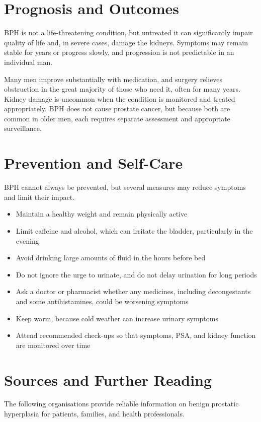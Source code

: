 \section*{Prognosis and Outcomes}
BPH is not a life-threatening condition, but untreated it can significantly impair quality of life and, in severe cases, damage the kidneys. Symptoms may remain stable for years or progress slowly, and progression is not predictable in an individual man.

Many men improve substantially with medication, and surgery relieves obstruction in the great majority of those who need it, often for many years. Kidney damage is uncommon when the condition is monitored and treated appropriately. BPH does not cause prostate cancer, but because both are common in older men, each requires separate assessment and appropriate surveillance.

\section*{Prevention and Self-Care}
BPH cannot always be prevented, but several measures may reduce symptoms and limit their impact.

\begin{itemize}
    \item Maintain a healthy weight and remain physically active
    \item Limit caffeine and alcohol, which can irritate the bladder, particularly in the evening
    \item Avoid drinking large amounts of fluid in the hours before bed
    \item Do not ignore the urge to urinate, and do not delay urination for long periods
    \item Ask a doctor or pharmacist whether any medicines, including decongestants and some antihistamines, could be worsening symptoms
    \item Keep warm, because cold weather can increase urinary symptoms
    \item Attend recommended check-ups so that symptoms, PSA, and kidney function are monitored over time
\end{itemize}

\section*{Sources and Further Reading}
The following organisations provide reliable information on benign prostatic hyperplasia for patients, families, and health professionals.

